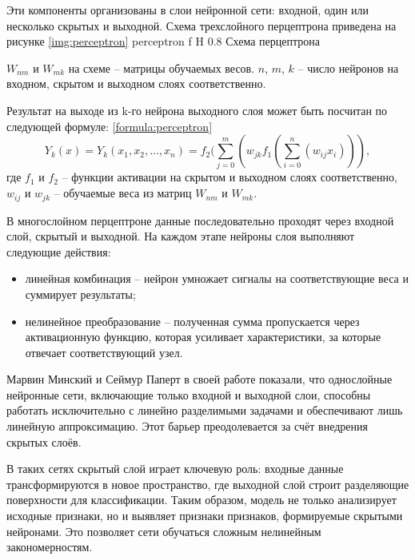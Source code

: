 Эти компоненты организованы в слои нейронной сети: входной, один или несколько скрытых и выходной.
Схема трехслойного перцептрона приведена на рисунке \ref{img:perceptron}
{perceptron} %
{f} %
{H} %
{0.8\textwidth} %
{Схема перцептрона} %

$W_{nm}$ и $W_{mk}$ на схеме -- матрицы обучаемых весов. $n$, $m$, $k$ -- число нейронов на входном, скрытом и выходном слоях соответственно. 

Результат на выходе из k-го нейрона выходного слоя может быть посчитан по следующей формуле: \ref{formula:perceptron}
\begin{equation}\label{formula:perceptron}
	Y_k(x) = Y_k(x_1, x_2, ..., x_n) = f_2(\sum_{j=0}^{m}(w_{jk} f_1(\sum_{i=0}^{n}(w_{ij}x_i))),
\end{equation}
где $f_1$ и $f_2$ -- функции активации на скрытом и выходном слоях соответственно, $w_{ij}$ и $w_{jk}$ -- обучаемые веса из матриц $W_{nm}$ и $W_{mk}$.

В многослойном перцептроне данные последовательно проходят через входной слой, скрытый и выходной.
На каждом этапе нейроны слоя выполняют следующие действия:
\begin{itemize}
	\item линейная комбинация -- нейрон умножает сигналы на соответствующие веса и суммирует результаты;
	\item нелинейное преобразование -- полученная сумма пропускается через активационную функцию, которая усиливает характеристики, за которые отвечает соответствующий узел.
\end{itemize}

Марвин Минский и Сеймур Паперт в своей работе \cite{minsky1969perceptrons} показали, что однослойные нейронные сети, включающие только входной и выходной слои, способны работать исключительно с линейно разделимыми задачами и обеспечивают лишь линейную аппроксимацию.
Этот барьер преодолевается за счёт внедрения скрытых слоёв.

В таких сетях скрытый слой играет ключевую роль: входные данные трансформируются в новое пространство, где выходной слой строит разделяющие поверхности для классификации.
Таким образом, модель не только анализирует исходные признаки, но и выявляет признаки признаков, формируемые скрытыми нейронами. 
Это позволяет сети обучаться сложным нелинейным закономерностям.

